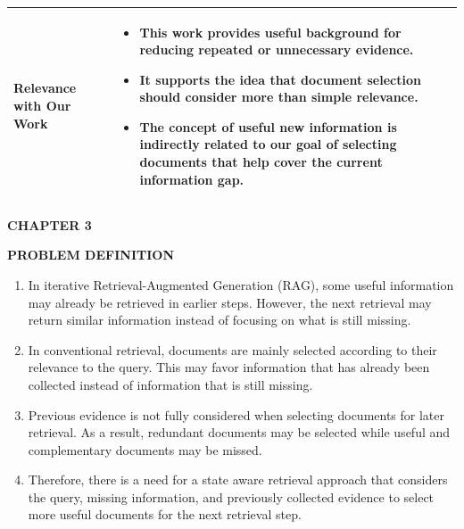 \documentclass[12pt,a4paper]{report}
\newcommand{\chaptertitle}[2]{
    \begin{center}
        {\fontsize{18}{21}\selectfont\bfseries CHAPTER #1\par}
        \vspace{0.10in}
        {\fontsize{18}{21}\selectfont\bfseries #2\par}
    \end{center}
    \vspace{0.12in}
}
\begin{document}
\begin{longtable}{|p{1.25in}|p{5.15in}|}
\textbf{Relevance with Our Work} &
\begin{itemize}[leftmargin=0.18in,itemsep=0.05in,topsep=0pt,parsep=0pt]
\item This work provides useful background for reducing repeated or unnecessary evidence.
\item It supports the idea that document selection should consider more than simple relevance.
\item The concept of useful new information is indirectly related to our goal of selecting documents that help cover the current information gap.
\end{itemize} \\ \hline

\end{longtable}
\label{ch:2:end}
\clearpage




\chaptertitle{3}{PROBLEM DEFINITION}
\label{ch:3}
\justifying

\begin{enumerate}[leftmargin=0.30in,itemsep=0.12in,parsep=0pt]

\item
In iterative Retrieval-Augmented Generation (RAG), some useful information may already be retrieved in earlier steps. However, the next retrieval may return similar information instead of focusing on what is still missing.

\item
In conventional retrieval, documents are mainly selected according to their relevance to the query. This may favor information that has already been collected instead of information that is still missing.

\item
Previous evidence is not fully considered when selecting documents for later retrieval. As a result, redundant documents may be selected while useful and complementary documents may be missed.

\item
Therefore, there is a need for a state aware retrieval approach that considers the query, missing information, and previously collected evidence to select more useful documents for the next retrieval step.

\end{enumerate}
\clearpage
\end{document}

